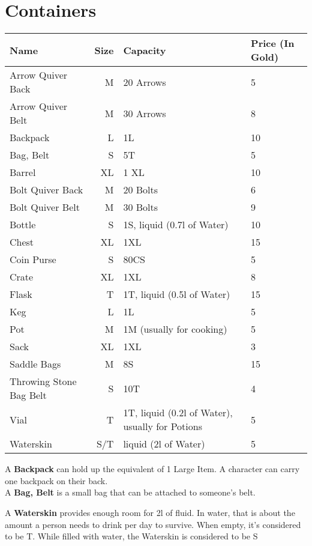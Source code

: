 \section{Containers}\label{sec:containers}
\begin{longtable}{l | r | p{4.5cm} | p{1.5cm}}
	Name & Size & Capacity & Price (In Gold)\\ \hline
	Arrow Quiver Back & M & 20 Arrows & 5 \\
	Arrow Quiver Belt & M & 30 Arrows & 8 \\
	Backpack & L & 1L & 10 \\
	Bag, Belt & S & 5T & 5 \\
	Barrel & XL & 1 XL & 10 \\
	Bolt Quiver Back & M & 20 Bolts & 6 \\
	Bolt Quiver Belt & M & 30 Bolts & 9 \\
	Bottle & S & 1S, liquid (0.7l of Water) & 10 \\
	Chest & XL & 1XL & 15 \\
	Coin Purse & S & 80CS & 5 \\
	Crate & XL & 1XL & 8 \\
	Flask & T & 1T, liquid (0.5l of Water) & 15 \\
	Keg & L & 1L & 5 \\
	Pot & M & 1M (usually for cooking) & 5 \\
	Sack & XL & 1XL & 3 \\
	Saddle Bags & M & 8S & 15 \\
	Throwing Stone Bag Belt & S & 10T & 4 \\
	Vial & T & 1T, liquid (0.2l of Water), usually for Potions & 5 \\
	Waterskin & S/T & liquid (2l of Water) & 5 \\
\end{longtable}

A \textbf{Backpack} can hold up the equivalent of 1 Large Item.
A character can carry one backpack on their back.\\

A \textbf{Bag, Belt} is a small bag that can be attached to someone's belt.

A \textbf{Waterskin} provides enough room for 2l of fluid.
In water, that is about the amount a person needs to drink per day to survive.
When empty, it's considered to be T.
While filled with water, the Waterskin is considered to be S\\
